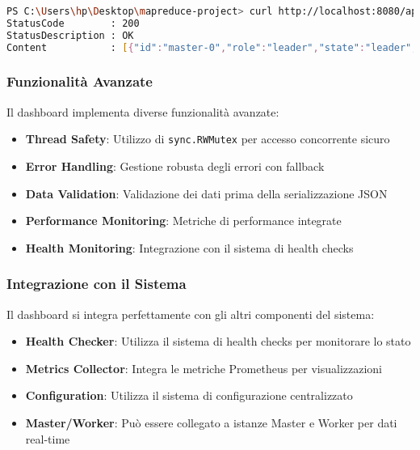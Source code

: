 \documentclass[12pt,a4paper]{article}
\begin{document}
\begin{lstlisting}[language=bash, caption=Test Endpoint Masters]
PS C:\Users\hp\Desktop\mapreduce-project> curl http://localhost:8080/api/v1/masters
StatusCode        : 200
StatusDescription : OK
Content           : [{"id":"master-0","role":"leader","state":"leader","leader":true,"last_seen":"2025-09-22T16:47:45.603032+02:00"},{"id":"master-1","role":"follower","state":"follower","leader":false,"last_seen":"2025-09-22T16:47:30.603032+02:00"}]
\end{lstlisting}

\subsubsection{Funzionalità Avanzate}

Il dashboard implementa diverse funzionalità avanzate:

\begin{itemize}
\item \textbf{Thread Safety}: Utilizzo di \texttt{sync.RWMutex} per accesso concorrente sicuro
\item \textbf{Error Handling}: Gestione robusta degli errori con fallback
\item \textbf{Data Validation}: Validazione dei dati prima della serializzazione JSON
\item \textbf{Performance Monitoring}: Metriche di performance integrate
\item \textbf{Health Monitoring}: Integrazione con il sistema di health checks
\end{itemize}

\subsubsection{Integrazione con il Sistema}

Il dashboard si integra perfettamente con gli altri componenti del sistema:

\begin{itemize}
\item \textbf{Health Checker}: Utilizza il sistema di health checks per monitorare lo stato
\item \textbf{Metrics Collector}: Integra le metriche Prometheus per visualizzazioni
\item \textbf{Configuration}: Utilizza il sistema di configurazione centralizzato
\item \textbf{Master/Worker}: Può essere collegato a istanze Master e Worker per dati real-time
\end{itemize}
\end{document}
